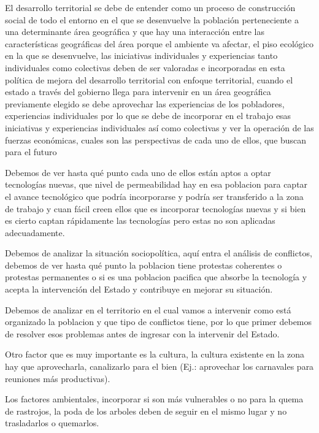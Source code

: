 \documentclass[
  jou,
  floatsintext,
  longtable,
  a4paper,
  nolmodern,
  notxfonts,
  notimes,
  12pt,
  colorlinks=true,linkcolor=blue,citecolor=blue,urlcolor=blue]{apa7}
\begin{document}
El desarrollo territorial se debe de entender como un proceso de
construcción social de todo el entorno en el que se desenvuelve la
población perteneciente a una determinante área geográfica y que hay una
interacción entre las características geográficas del área porque el
ambiente va afectar, el piso ecológico en la que se desenvuelve, las
iniciativas individuales y experiencias tanto individuales como
colectivas deben de ser valoradas e incorporadas en esta política de
mejora del desarrollo territorial con enfoque territorial, cuando el
estado a través del gobierno llega para intervenir en un área geográfica
previamente elegido se debe aprovechar las experiencias de los
pobladores, experiencias individuales por lo que se debe de incorporar
en el trabajo esas iniciativas y experiencias individuales así como
colectivas y ver la operación de las fuerzas económicas, cuales son las
perspectivas de cada uno de ellos, que buscan para el futuro

Debemos de ver hasta qué punto cada uno de ellos están aptos a optar
tecnologías nuevas, que nivel de permeabilidad hay en esa poblacion para
captar el avance tecnológico que podría incorporarse y podría ser
transferido a la zona de trabajo y cuan fácil creen ellos que es
incorporar tecnologías nuevas y si bien es cierto captan rápidamente las
tecnologías pero estas no son aplicadas adecuadamente.

Debemos de analizar la situación sociopolítica, aquí entra el análisis
de conflictos, debemos de ver hasta qué punto la poblacion tiene
protestas coherentes o protestas permanentes o si es una poblacion
pacifica que absorbe la tecnología y acepta la intervención del Estado y
contribuye en mejorar su situación.

Debemos de analizar en el territorio en el cual vamos a intervenir como
está organizado la poblacion y que tipo de conflictos tiene, por lo que
primer debemos de resolver esos problemas antes de ingresar con la
intervenir del Estado.

Otro factor que es muy importante es la cultura, la cultura existente en
la zona hay que aprovecharla, canalizarlo para el bien (Ej.: aprovechar
los carnavales para reuniones más productivas).

Los factores ambientales, incorporar si son más vulnerables o no para la
quema de rastrojos, la poda de los arboles deben de seguir en el mismo
lugar y no trasladarlos o quemarlos.
\end{document}
